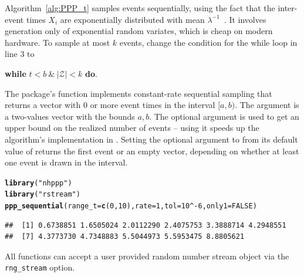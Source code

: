 \documentclass[article,nojss]{jss}\usepackage[]{graphicx}\usepackage[]{xcolor}
\makeatletter
\newcommand{\hlnum}[1]{\textcolor[rgb]{0.686,0.059,0.569}{#1}}%
\newcommand{\hlstr}[1]{\textcolor[rgb]{0.192,0.494,0.8}{#1}}%
\newcommand{\hlopt}[1]{\textcolor[rgb]{0,0,0}{#1}}%
\newcommand{\hlstd}[1]{\textcolor[rgb]{0.345,0.345,0.345}{#1}}%
\newcommand{\hlkwc}[1]{\textcolor[rgb]{0.333,0.667,0.333}{#1}}%
\newcommand{\hlkwd}[1]{\textcolor[rgb]{0.737,0.353,0.396}{\textbf{#1}}}%
\newenvironment{kframe}{%
 \def\at@end@of@kframe{}%
 \ifinner\ifhmode%
  \def\at@end@of@kframe{\end{minipage}}%
  \begin{minipage}{\columnwidth}%
 \fi\fi%
 \def\FrameCommand##1{\hskip\@totalleftmargin \hskip-\fboxsep
 \colorbox{shadecolor}{##1}\hskip-\fboxsep
     \hskip-\linewidth \hskip-\@totalleftmargin \hskip\columnwidth}%
 \MakeFramed {\advance\hsize-\width
   \@totalleftmargin\z@ \linewidth\hsize
   \@setminipage}}%
 {\par\unskip\endMakeFramed%
 \at@end@of@kframe}
\newenvironment{knitrout}{}{} %
\newcommand{\fct}[1]{\code{#1()}}
\makeatother
\begin{document}


Algorithm~\ref{alg:PPP_t} samples events sequentially, using the fact that the inter-event times $X_i$ are exponentially distributed with mean $\lambda^{-1}$~\citep[par. 4.1]{cox1965theory}. It involves generation only of exponential random variates, which is cheap on modern hardware. To sample at most $k$ events, change the condition for the while loop in line 3 to
\begin{center}
\textbf{while} {$t <b  \ \& \  |\mathcal{Z}| < k$} \textbf{do}.
\end{center}

The package's \fct{ppp\_sequential} function implements constant-rate sequential sampling that returns a vector with 0 or more event times in the interval $[a, b)$. The  argument is a two-values vector with the bounds $a, b$. The optional  argument is used to get an upper bound on the realized number of events -- using it speeds up the algorithm's implementation in . Setting the optional argument  to  from its default value of  returns the first event or an empty vector, depending on whether at least one event is drawn in the interval.

\begin{knitrout}
\color{fgcolor}\begin{kframe}
\begin{alltt}
\hlkwd{library}\hlstd{(}\hlstr{"nhppp"}\hlstd{)}
\hlkwd{library}\hlstd{(}\hlstr{"rstream"}\hlstd{)}
\hlkwd{ppp_sequential}\hlstd{(}\hlkwc{range_t} \hlstd{=} \hlkwd{c}\hlstd{(}\hlnum{0}\hlstd{,} \hlnum{10}\hlstd{),} \hlkwc{rate} \hlstd{=} \hlnum{1}\hlstd{,} \hlkwc{tol} \hlstd{=} \hlnum{10}\hlopt{^-}\hlnum{6}\hlstd{,} \hlkwc{only1} \hlstd{=} \hlnum{FALSE}\hlstd{)}
\end{alltt}
\begin{verbatim}
##  [1] 0.6738851 1.6505024 2.0112290 2.4075753 3.3888714 4.2948551
##  [7] 4.3773730 4.7348883 5.5044973 5.5953475 8.8805621
\end{verbatim}
\end{kframe}
\end{knitrout}

All  functions can accept a user provided random number stream object via the \texttt{rng\_stream} option.
\end{document}
